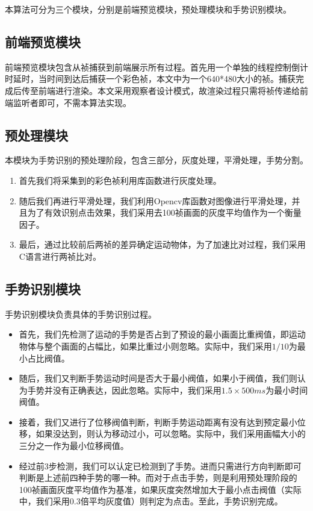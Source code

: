 \documentclass{XDBAthesis}
\begin{document}
本算法可分为三个模块，分别是前端预览模块，预处理模块和手势识别模块。
\subsection{前端预览模块}
前端预览模块包含从祯捕获到前端展示所有过程。首先用一个单独的线程控制倒计时延时，当时间到达后捕获一个彩色祯，本文中为一个640*480大小的祯。捕获完成后传至前端进行渲染。本文采用观察者设计模式，故渲染过程只需将祯传递给前端监听者即可，不需本算法实现。
\subsection{预处理模块}
本模块为手势识别的预处理阶段，包含三部分，灰度处理，平滑处理，手势分割。
\begin{enumerate}
    \item 首先我们将采集到的彩色祯利用库函数进行灰度处理。
    \item 随后我们再进行平滑处理，我们利用Opencv库函数对图像进行平滑处理，并且为了有效识别点击效果，我们采用去100祯画面的灰度平均值作为一个衡量因子。
    \item 最后，通过比较前后两祯的差异确定运动物体，为了加速比对过程，我们采用C语言进行两祯比对。
\end{enumerate}
\subsection{手势识别模块}
手势识别模块负责具体的手势识别过程。
\begin{itemize}
    \item 首先，我们先检测了运动的手势是否占到了预设的最小画面比重阀值，即运动物体与整个画面的占幅比，如果比重过小则忽略。实际中，我们采用$1/10$为最小占比阀值。
    \item 随后，我们又判断手势运动时间是否大于最小阀值，如果小于阀值，我们则认为手势并没有正确表达，因此忽略。实际中，我们采用$1.5\times 500ms$为最小时间阀值。
    \item 接着，我们又进行了位移阀值判断，判断手势运动距离有没有达到预定最小位移，如果没达到，则认为移动过小，可以忽略。实际中，我们采用画幅大小的三分之一作为最小位移阀值。
    \item 经过前3步检测，我们可以认定已检测到了手势。进而只需进行方向判断即可判断是上述前四种手势的哪一种。而对于点击手势，则是利用预处理阶段的100祯画面灰度平均值作为基准，如果灰度突然增加大于最小点击阀值（实际中，我们采用0.3倍平均灰度值）则判定为点击。至此，手势识别完成。
\end{itemize}
\end{document}
